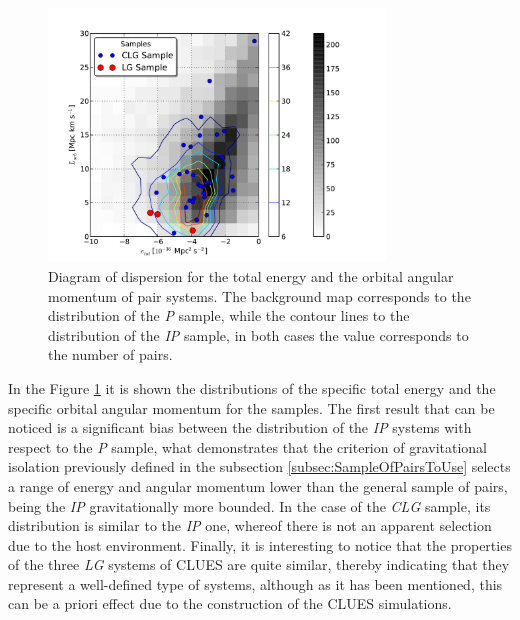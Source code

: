\begin{figure}[htbp]
	\centering
	\includegraphics[trim = 8mm 0mm 25mm 10mm, clip, width=0.8\textwidth]
	{./figures/4_results/CLG_E_vs_L.pdf}
	
	\caption{\small{Diagram of dispersion for the total energy and the 
	orbital angular momentum of pair systems. The background map
	corresponds to the distribution of the \textit{P} sample, while the
	contour lines to the distribution of the \textit{IP} sample, in both
	cases the value corresponds to the number of pairs. }}
	\label{fig:CLG_E-L}
\end{figure}


In the Figure \ref{fig:CLG_E-L} it is shown the distributions of the 
specific total energy and the specific orbital angular momentum for the 
samples. The first result that can be noticed is a significant bias 
between the distribution of the \textit{IP} systems with respect to the 
\textit{P} sample, what demonstrates that the criterion of gravitational 
isolation previously defined in the subsection \ref{subsec:SampleOfPairsToUse}
selects a range of energy and angular momentum lower than the general 
sample of pairs, being the \textit{IP} gravitationally more bounded. In
the case of the \textit{CLG} sample, its distribution is similar to the
\textit{IP} one, whereof there is not an apparent selection due to the
host environment. Finally, it is interesting to notice that the properties
of the three \textit{LG} systems of CLUES are quite similar, thereby 
indicating that they represent a well-defined type of systems, although
as it has been mentioned, this can be a priori effect due to 
the construction of the CLUES simulations.


